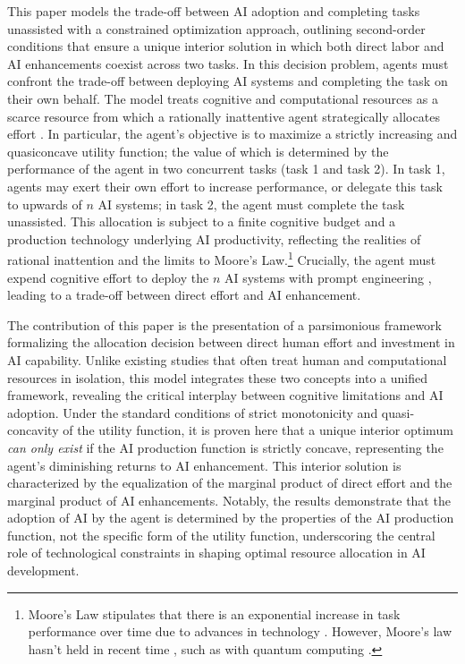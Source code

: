 \documentclass[11pt]{article}
\theoremstyle{definition}
\theoremstyle{remark}
\begin{document}
This paper models the trade-off between AI adoption and completing tasks unassisted with a constrained optimization approach, outlining second-order conditions that ensure a unique interior solution in which both direct labor and AI enhancements coexist across two tasks. In this decision problem, agents must confront the trade-off between deploying AI systems and completing the task on their own behalf. The model treats cognitive and computational resources as a scarce resource from which a rationally inattentive agent strategically allocates effort \citep{sims2003implications,caplin2015revealed,dewan2020estimating,mackowiak2023rational}. In particular, the agent’s objective is to maximize a strictly increasing and quasiconcave utility function; the value of which is determined by the performance of the agent in two concurrent tasks (task 1 and task 2). In task 1, agents may exert their own effort to increase performance, or delegate this task to upwards of $n$ AI systems; in task 2, the agent must complete the task unassisted. This allocation is subject to a finite cognitive budget and a production technology underlying AI productivity, reflecting the realities of rational inattention and the limits to Moore's Law.\footnote{Moore's Law stipulates that there is an exponential increase in task performance over time due to advances in technology \citep{moore1998cramming}. However, Moore's law hasn't held in recent time \citep{waldrop2016chips}, such as with quantum computing \citep{powell2008quantum}.} Crucially, the agent must expend cognitive effort to deploy the $n$ AI systems with prompt engineering \citep{giray2023prompt}, leading to a trade-off between direct effort and AI enhancement.

The contribution of this paper is the presentation of a parsimonious framework formalizing the allocation decision between direct human effort and investment in AI capability. Unlike existing studies that often treat human and computational resources in isolation, this model integrates these two concepts into a unified framework, revealing the critical interplay between cognitive limitations and AI adoption. Under the standard conditions of strict monotonicity and quasi-concavity of the utility function, it is proven here that a unique interior optimum \textit{can only exist} if the AI production function is strictly concave, representing the agent's diminishing returns to AI enhancement. This interior solution is characterized by the equalization of the marginal product of direct effort and the marginal product of AI enhancements. Notably, the results demonstrate that the adoption of AI by the agent is determined by the properties of the AI production function, not the specific form of the utility function, underscoring the central role of technological constraints in shaping optimal resource allocation in AI development.
\end{document}
